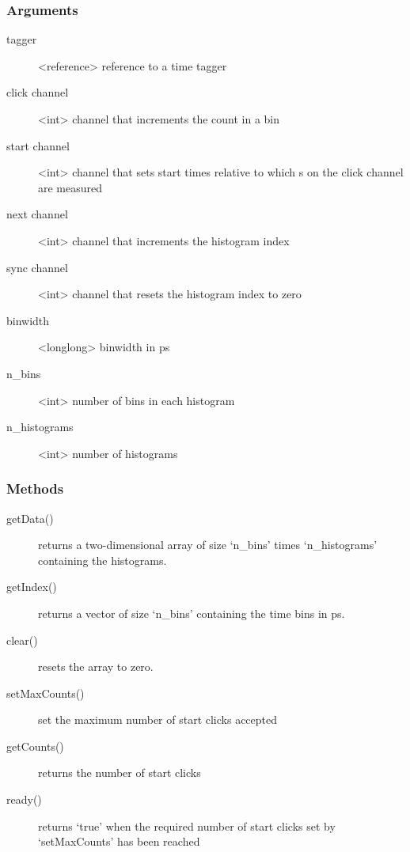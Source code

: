 \documentclass[letterpaper,10pt,english]{sphinxmanual}
\begin{document}
\subsubsection{Arguments}
\label{sections/api:id6}\begin{description}
\item[{tagger}] \leavevmode
\textless{}reference\textgreater{} reference to a time tagger

\item[{click channel}] \leavevmode
\textless{}int\textgreater{} channel that increments the count in a bin

\item[{start channel}] \leavevmode
\textless{}int\textgreater{} channel that sets start times relative to which s on the click channel are measured

\item[{next channel}] \leavevmode
\textless{}int\textgreater{} channel that increments the histogram index

\item[{sync channel}] \leavevmode
\textless{}int\textgreater{} channel that resets the histogram index to zero

\item[{binwidth}] \leavevmode
\textless{}longlong\textgreater{} binwidth in ps

\item[{n\_bins}] \leavevmode
\textless{}int\textgreater{} number of bins in each histogram

\item[{n\_histograms}] \leavevmode
\textless{}int\textgreater{} number of histograms

\end{description}


\subsubsection{Methods}
\label{sections/api:id7}\begin{description}
\item[{getData()}] \leavevmode
returns a two-dimensional array of size `n\_bins' times `n\_histograms' containing the histograms.

\item[{getIndex()}] \leavevmode
returns a vector of size `n\_bins' containing the time bins in ps.

\item[{clear()}] \leavevmode
resets the array to zero.

\item[{setMaxCounts()}] \leavevmode
set the maximum number of start clicks accepted

\item[{getCounts()}] \leavevmode
returns the number of start clicks

\item[{ready()}] \leavevmode
returns `true' when the required number of start clicks set by `setMaxCounts' has been reached

\end{description}
\end{document}
